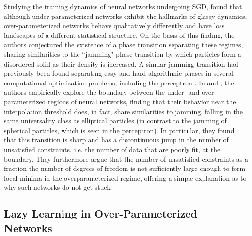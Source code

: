 \documentclass[a4paper, 11pt]{article}
\begin{document}
Studying the training dynamics of neural networks undergoing SGD, \cite{baity-jesiComparingDynamicsDeep2019} found that although under-parameterized networks exhibit the hallmarks of glassy dynamics, over-parameterized networks behave qualitatively differently and have loss landscapes of a different statistical structure. On the basis of this finding, the authors conjectured the existence of a phase transition separating these regimes, sharing similarities to the ``jamming" phase transition by which particles form a disordered solid as their density is increased. A similar jamming transition had previously been found separating easy and hard algorithmic phases in several computational optimization problems, including the perceptron \cite{krzakalaLandscapeAnalysisConstraint2007,zdeborovaPhaseTransitionsColoring2007,franzUniversalitySATUNSATJamming2017}. In \cite{geigerJammingTransitionParadigm2019} and \cite{spiglerJammingTransitionOverparametrization2019}, the authors empirically explore the boundary between the under- and over-parameterized regions of neural networks, finding that their behavior near the interpolation threshold does, in fact, share similarities to jamming, falling in the same universality class as elliptical particles (in contrast to the jamming of spherical particles, which is seen in the perceptron). In particular, they found that this transition is sharp and has a discontinuous jump in the number of unsatisfied constraints, i.e. the number of data that are poorly fit, at the boundary. They furthermore argue that the number of unsatisfied constraints as a fraction the number of degrees of freedom is not sufficiently large enough to form local minima in the overparameterized regime, offering a simple explanation as to why such networks do not get stuck.

\subsection{Lazy Learning in Over-Parameterized Networks}
\end{document}
